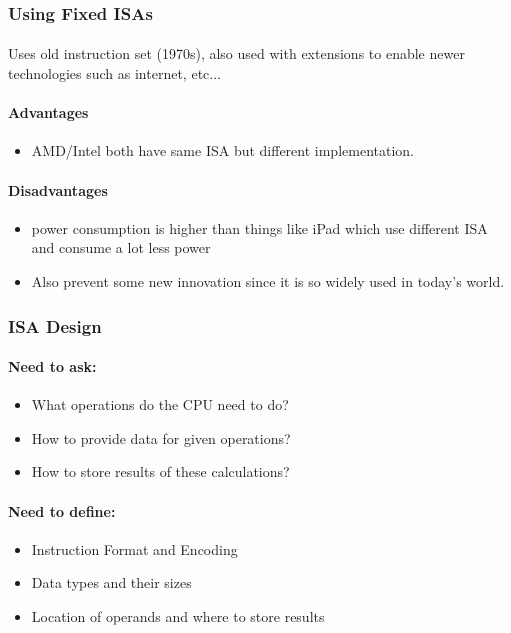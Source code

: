 \documentclass{article}
\newcommand\tab[1][0.5cm]{\hspace*{#1}}
\begin{document}
		\subsubsection{Using Fixed ISAs}
			\paragraph{} Uses old instruction set (1970s), also used with extensions to enable newer technologies such as internet, etc...

			\paragraph{\tab Advantages}
			\begin{itemize}
				\item AMD/Intel both have same ISA but different implementation.
			\end{itemize}

			\paragraph{\tab Disadvantages}
				\begin{itemize}
					\item power consumption is higher than things like iPad which use different ISA and consume a lot less power
					\item Also prevent some new innovation since it is so widely used in today's world.
				\end{itemize}


		\subsubsection{ISA Design}
			\paragraph{\tab Need to ask:}
			\begin{itemize}
				\item What operations do the CPU need to do?
				\item How to provide data for given operations?
				\item How to store results of these calculations?
			\end{itemize}

			\paragraph{\tab Need to define:}
			\begin{itemize}
				\item Instruction Format and Encoding
				\item Data types and their sizes
				\item Location of operands and where to store results
			\end{itemize}
\end{document}
